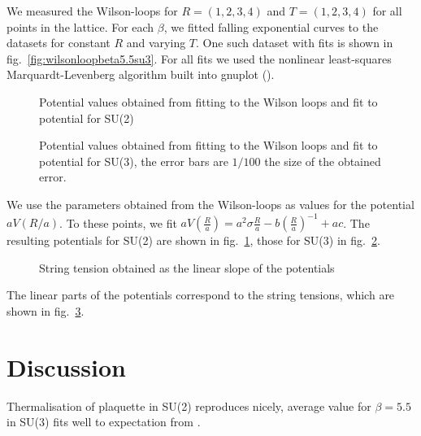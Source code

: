\documentclass[%
 reprint,
 amsmath,amssymb,
 aps,
]{revtex4-1}
\begin{document}
We measured the Wilson-loops for $R=(1,2,3,4)$ and $T=(1,2,3,4)$ for all points in the lattice. For each $\beta$, we fitted falling exponential curves to the datasets for constant $R$ and varying $T$. One such dataset with fits is shown in fig.~\ref{fig:wilsonloopbeta5.5su3}. For all fits we used the nonlinear least-squares Marquardt-Levenberg algorithm built into gnuplot (\citet{gnuplotdoc}).



\begin{figure}
	\centering
	
	\caption[Potentials obtained using SU(2)]{Potential values obtained from fitting to the Wilson loops and fit to potential for SU(2)}
	\label{fig:fittedpotentialssu2}
\end{figure} 


\begin{figure}
	\centering
	
	\caption[Potentials obtained using SU(3)]{Potential values obtained from fitting to the Wilson loops and fit to potential for SU(3), the error bars are $1/100$ the size of the obtained error.}
	\label{fig:fittedpotentialssu3}
\end{figure} 

We use the parameters obtained from the Wilson-loops as values for the potential $aV(R/a)$. To these points, we fit $aV\left(\frac{R}{a}\right)=a^2\sigma \frac{R}{a}-b\left(\frac{R}{a}\right)^{-1}+ac$. The resulting potentials for SU(2) are shown in fig.~\ref{fig:fittedpotentialssu2}, those for SU(3) in fig.~\ref{fig:fittedpotentialssu3}.


\begin{figure}
	\centering
	
	\caption[String tension obtained from potential]{String tension obtained as the linear slope of the potentials}
	\label{fig:stringtension}
\end{figure}

The linear parts of the potentials correspond to the string tensions, which are shown in fig.~\ref{fig:stringtension}.


\section{Discussion}

Thermalisation of plaquette in SU(2) reproduces \citet{creutzsu2} nicely, average value for $\beta=5.5$ in SU(3) fits well to expectation from \citet{lepagelqcd}.
\end{document}
